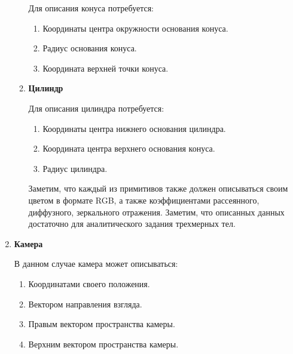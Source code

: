 \begin{enumerate}
\begin{enumerate}[label*=\arabic*.]
		Для описания конуса потребуется:
		\begin{enumerate}[label*=\arabic*.]
			\item Координаты центра окружности основания конуса.
			\item Радиус основания конуса.
			\item Координата верхней точки конуса.
		\end{enumerate}
		\item  \textbf{Цилиндр}
		
		Для описания цилиндра потребуется:
		\begin{enumerate}[label*=\arabic*.]
			\item Координаты центра нижнего основания цилиндра.
			\item Координата центра верхнего основания конуса.
			\item Радиус цилиндра.
		\end{enumerate}
		Заметим, что каждый из примитивов также должен описываться своим цветом в формате RGB, а также
		коэффициентами рассеянного, диффузного, зеркального отражения. Заметим, что описанных данных достаточно для аналитического задания трехмерных тел.
		
	\end{enumerate}

	\item \textbf{Камера}
	
	В данном случае камера может описываться:
	\begin{enumerate}[label*=\arabic*.]
		\item Координатами своего положения.
		\item Вектором направления взгляда.
		\item Правым вектором пространства камеры.
		\item Верхним вектором пространства камеры.
	\end{enumerate}
	
\end{enumerate}


